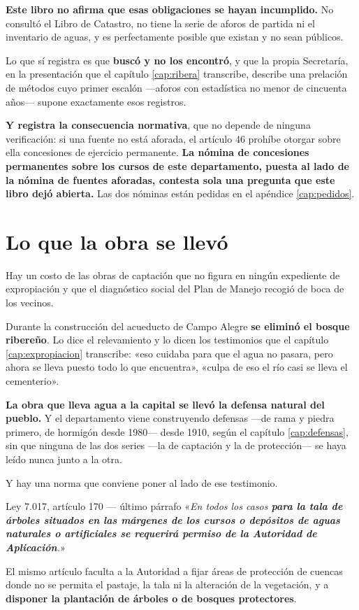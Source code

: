 \begin{cautela}
\textbf{Este libro no afirma que esas obligaciones se hayan incumplido.} No consultó el Libro
de Catastro, no tiene la serie de aforos de partida ni el inventario de aguas, y es
perfectamente posible que existan y no sean públicos.

Lo que sí registra es que \textbf{buscó y no los encontró}, y que la propia Secretaría, en la
presentación que el capítulo \ref{cap:ribera} transcribe, describe una prelación de métodos
cuyo primer escalón ---aforos con estadística no menor de cincuenta años--- supone
exactamente esos registros.

\textbf{Y registra la consecuencia normativa}, que no depende de ninguna verificación: si una
fuente no está aforada, el artículo 46 prohíbe otorgar sobre ella concesiones de ejercicio
permanente. \textbf{La nómina de concesiones permanentes sobre los cursos de este departamento,
puesta al lado de la nómina de fuentes aforadas, contesta sola una pregunta que este libro dejó
abierta.} Las dos nóminas están pedidas en el apéndice \ref{cap:pedidos}.
\end{cautela}

\section{Lo que la obra se llevó}

Hay un costo de las obras de captación que no figura en ningún expediente de expropiación y
que el diagnóstico social del Plan de Manejo recogió de boca de los vecinos.

Durante la construcción del acueducto de Campo Alegre \textbf{se eliminó el bosque ribereño}.
Lo dice el relevamiento y lo dicen los testimonios que el capítulo \ref{cap:expropiacion}
transcribe: «eso cuidaba para que el agua no pasara, pero ahora se lleva puesto todo lo que
encuentra», «culpa de eso el río casi se lleva el cementerio».

\textbf{La obra que lleva agua a la capital se llevó la defensa natural del pueblo.} Y el
departamento viene construyendo defensas ---de rama y piedra primero, de hormigón desde 1980--- desde 1910, según el capítulo
\ref{cap:defensas}, sin que ninguna de las dos series ---la de captación y la de protección---
se haya leído nunca junto a la otra.

Y hay una norma que conviene poner al lado de ese testimonio.

\begin{ficha}{Ley 7.017, artículo 170 --- último párrafo}
«\textit{En todos los casos \textbf{para la tala de árboles situados en las márgenes de los
cursos o depósitos de aguas naturales o artificiales se requerirá permiso de la Autoridad de
Aplicación}.}»

El mismo artículo faculta a la Autoridad a fijar áreas de protección de cuencas donde no se
permita el pastaje, la tala ni la alteración de la vegetación, y a \textbf{disponer la
plantación de árboles o de bosques protectores}.
\end{ficha}

